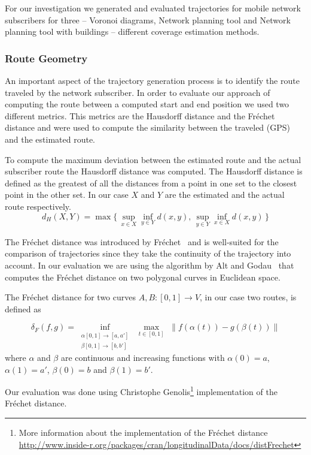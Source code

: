 \documentclass[twocolumn]{bmcart}%
\begin{document}
For our investigation we generated and evaluated trajectories for mobile network subscribers for three -- Voronoi diagrams, Network planning tool and Network planning tool with buildings -- different coverage estimation methods.
\subsubsection*{Route Geometry}
An important aspect of the trajectory generation process is to identify the route traveled by the network subscriber. In order to evaluate our approach of computing the route between a computed start and end position we used two different metrics. This metrics are the Hausdorff distance and the Fr\'{e}chet distance and were used to compute the similarity between the traveled (GPS) and the estimated route. 

To compute the maximum deviation between the estimated route and the actual subscriber route the Hausdorff distance was computed. The Hausdorff distance is defined as the greatest of all the distances from a point in one set to the closest point in the other set. In our case $X$ and $Y$ are the estimated and the actual route respectively.
\[ d_{H}(X,Y) = \max\{\,\sup_{x \in X} \inf_{y \in Y} d(x,y),\, \sup_{y \in Y} \inf_{x \in X} d(x,y)\,\}\]

The Fr\'{e}chet distance was introduced by Fr\'{e}chet~\cite{Frechet} and is well-suited for the comparison of trajectories since they take the continuity of the trajectory into account. In our evaluation we are using the algorithm by Alt and Godau~\cite{Alt1995} that computes the Fr\'{e}chet distance on two polygonal curves in Euclidean space.

The Fr\'{e}chet distance for two curves $A,B:[0,1]\rightarrow V$, in our case two routes, is defined as 


\[\delta_F(f,g)=\inf_{\substack{\alpha [0,1] \rightarrow [a,a'] \\\beta [0,1] \rightarrow [b,b']} }\,\, \max_{t \in [0,1]} \,\, \lVert f(\alpha(t))-g(\beta(t)) \rVert\]
where $\alpha$ and $\beta$ are continuous and increasing functions with $\alpha(0)=a$, $\alpha(1)=a'$, $\beta(0)=b$ and $\beta(1)=b'$. 

Our evaluation was done using Christophe Genolis\footnote{More information about the implementation of the Fr\'{e}chet distance \url{http://www.inside-r.org/packages/cran/longitudinalData/docs/distFrechet}} implementation of the Fr\'{e}chet distance.
\end{document}
